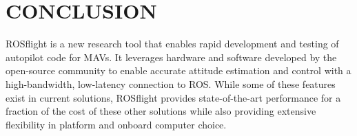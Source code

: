 \documentclass[letterpaper, 10 pt, conference]{ieeeconf}  %
\begin{document}

\section{CONCLUSION}
ROSflight is a new research tool that enables rapid development and testing of autopilot code for MAVs.  It leverages hardware and software developed by the open-source community to enable accurate attitude estimation and control with a high-bandwidth, low-latency connection to ROS.  While some of these features exist in current solutions, ROSflight provides state-of-the-art performance for a fraction of the cost of these other solutions while also providing extensive flexibility in platform and onboard computer choice.









\end{document}
